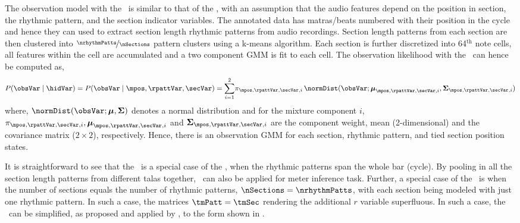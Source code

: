 The observation model with the \spmodel\ is similar to that of the \bpmodel, with an assumption that the audio features depend on the position in section, the rhythmic pattern, and the section indicator variables. The annotated data has \glspl{matra}/beats numbered with their position in the cycle and hence they can used to extract section length rhythmic patterns from audio recordings. Section length patterns from each section are then clustered into $\nicefrac{\nrhythmPatts}{\nSections}$ pattern clusters using a k-means algorithm. Each section is further discretized into 64$^{\mathrm{th}}$ note cells, all features within the cell are accumulated and a two component \gls{GMM} is fit to each cell. The observation likelihood with the \spmodel\ can hence be computed as, 
\begin{equation}\label{eqn:spm:obsmodel}
P(\obsVar \mid \hidVar) = P(\obsVar \mid \mpos,\rpattVar,\secVar) = \overset{2}{\underset{i=1}{\sum}}\pi_{\mpos,\rpattVar,\secVar,i}\,\normDist(\obsVar;\boldsymbol{\mu}_{\mpos,\rpattVar,\secVar,i},\boldsymbol{\Sigma}_{\mpos,\rpattVar,\secVar, i}) 
\end{equation}
where, $\normDist(\obsVar;\boldsymbol{\mu},\boldsymbol{\Sigma})$ denotes a normal distribution and for the mixture component $i$, $\pi_{\mpos,\rpattVar,\secVar,i}, \boldsymbol{\mu}_{\mpos,\rpattVar,\secVar,i}$ and $\boldsymbol{\Sigma}_{\mpos,\rpattVar,\secVar,i}$ are the component weight, mean (2-dimensional) and the covariance matrix ($2\times2$), respectively. Hence, there is an observation \gls{GMM} for each section, rhythmic pattern, and tied section position states. 


It is straightforward to see that the \bpmodel\ is a special case of the \spmodel, when the rhythmic patterns span the whole bar (cycle). By pooling in all the section length patterns from different \glspl{tala} together, \spmodel\ can also be applied for meter inference task. Further, a special case of the \spmodel\ is when the number of sections equals the number of rhythmic patterns, $\nSections = \nrhythmPatts$, with each section being modeled with just one rhythmic pattern. In such a case, the matrices $\tmPatt = \tmSec$ rendering the additional $r$ variable superfluous. In such a case, the \spmodel\ can be simplified, as proposed and applied by , to the form shown in .

